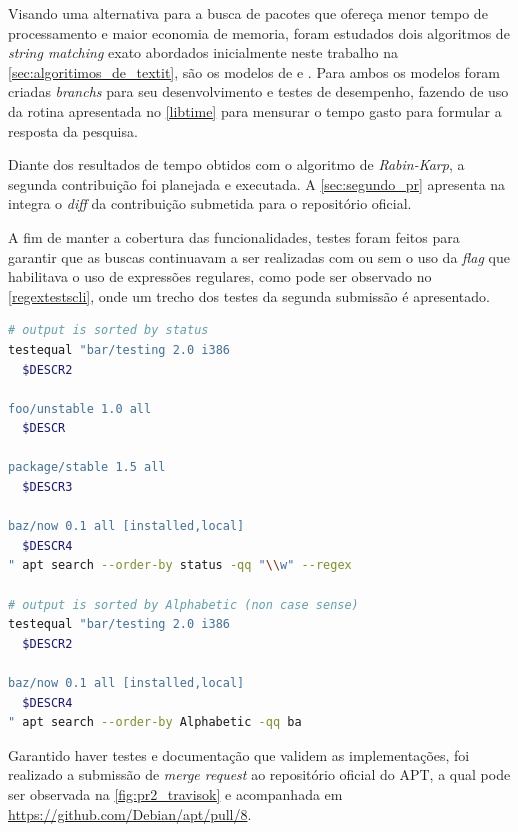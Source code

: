 

Visando uma alternativa para a busca de pacotes que ofereça menor tempo de processamento e maior economia de memoria, foram estudados dois algoritmos de \textit{string matching} exato abordados inicialmente neste trabalho na \autoref{sec:algoritimos_de_textit}, são os modelos de  e . Para ambos os modelos foram criadas \textit{branchs} para seu desenvolvimento e testes de desempenho, fazendo de uso da rotina apresentada no \autoref{libtime} para mensurar o tempo gasto para formular a resposta da pesquisa. 

Diante dos resultados de tempo obtidos com o algoritmo de \textit{Rabin-Karp}, a segunda contribuição foi planejada e executada. A \autoref{sec:segundo_pr} apresenta na integra o \textit{diff} da contribuição submetida para o repositório oficial.


A fim de manter a cobertura das funcionalidades, testes foram feitos para garantir que as buscas continuavam a ser realizadas com ou sem o uso da \textit{flag} que habilitava o uso de expressões regulares, como pode ser observado no \autoref{regextestscli}, onde um trecho dos testes da segunda submissão é apresentado.

\begin{lstlisting}[language=Bash,label=regextestscli,caption={Teste com e sem o uso de expressões regulares}]
# output is sorted by status
testequal "bar/testing 2.0 i386
  $DESCR2

foo/unstable 1.0 all
  $DESCR

package/stable 1.5 all
  $DESCR3

baz/now 0.1 all [installed,local]
  $DESCR4
" apt search --order-by status -qq "\\w" --regex

# output is sorted by Alphabetic (non case sense)
testequal "bar/testing 2.0 i386
  $DESCR2

baz/now 0.1 all [installed,local]
  $DESCR4
" apt search --order-by Alphabetic -qq ba
\end{lstlisting}

Garantido haver testes e documentação que validem as implementações, foi realizado a submissão de \textit{merge request} ao repositório oficial do APT, a qual pode ser observada na \autoref{fig:pr2_travisok} e acompanhada em \url{https://github.com/Debian/apt/pull/8}.

